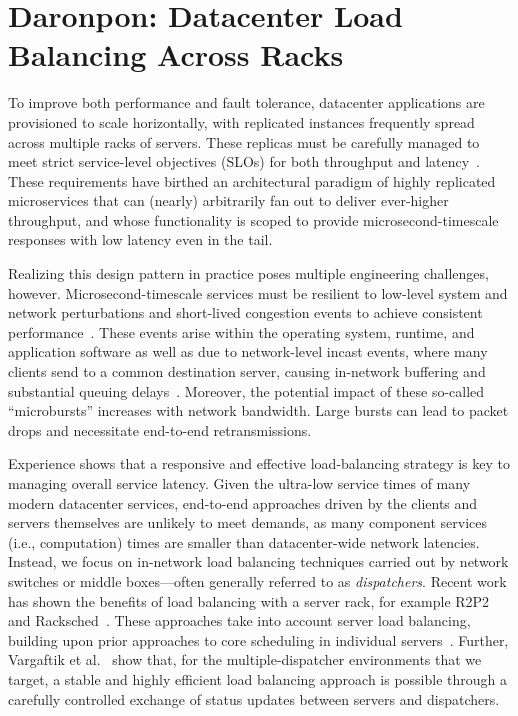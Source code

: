 \chapter{Daronpon: Datacenter Load Balancing Across Racks}
\label{daronpon:chap}



To improve both performance and fault tolerance, datacenter
applications are provisioned to scale horizontally, with replicated
instances frequently spread across multiple racks of servers.  These
replicas must be carefully managed to meet strict service-level
objectives (SLOs) for both throughput and
latency~\cite{killer_microseconds,tail_at_scale}. These requirements
have birthed an architectural paradigm of highly replicated
microservices that can (nearly) arbitrarily fan out to deliver
ever-higher throughput, and whose functionality is scoped to provide
microsecond-timescale responses with low latency even in the tail.

Realizing this design pattern in practice poses multiple engineering
challenges, however.  Microsecond-timescale services must be resilient
to low-level system and network perturbations and short-lived
congestion events to achieve consistent
performance~\cite{facebook_microburst}.  These events arise within the
operating system, runtime, and application software as well as due to
network-level incast events, where many clients send to a
common destination server, causing in-network buffering and
substantial queuing delays~\cite{scale-memcache:nsdi:2013}.  Moreover, the
potential impact of these so-called ``microbursts'' increases with
network bandwidth.  Large bursts can lead to packet drops and
necessitate end-to-end retransmissions.

Experience shows that a responsive and effective load-balancing
strategy is key to managing overall service latency.  Given the
ultra-low service times of many modern datacenter services, end-to-end
approaches driven by the clients and servers themselves are unlikely
to meet demands, as many component services (i.e., computation) times
are smaller than datacenter-wide network latencies. Instead, we focus
on in-network load balancing techniques carried out by network
switches or middle boxes---often generally referred to as
\textit{dispatchers}.  Recent work has shown the benefits of load balancing
with a server rack, for example R2P2~\cite{r2p2} and
Racksched~\cite{racksched}.  These approaches take into account server
load balancing, building upon prior approaches to core scheduling in
individual servers~\cite{IX, shinjuku:nsdi:2019, shenango:nsdi:2019,seda}. Further,
Vargaftik et al.~\cite{lsq} show that, for the multiple-dispatcher
environments that we target, a stable and highly efficient load
balancing approach is possible through a carefully controlled exchange
of status updates between servers and dispatchers.

